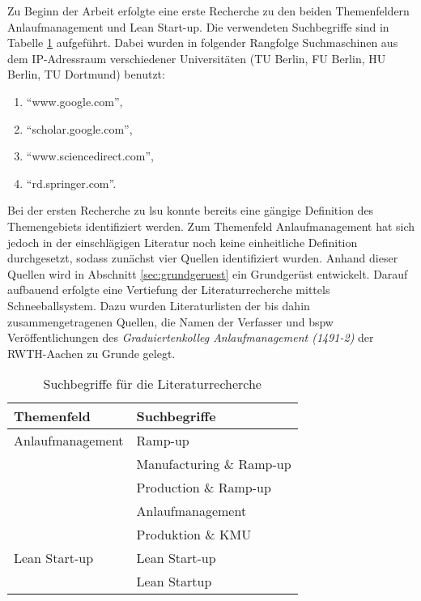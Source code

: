 Zu Beginn der Arbeit erfolgte eine erste Recherche zu den beiden Themenfeldern Anlaufmanagement und Lean Start-up. Die verwendeten Suchbegriffe sind in Tabelle \ref{tab:algorythm} aufgeführt. Dabei wurden in folgender Rangfolge Suchmaschinen aus dem IP-Adressraum verschiedener Universitäten (TU Berlin, FU Berlin, HU Berlin, TU Dortmund) benutzt: 
\begin{enumerate}
 \item ``www.google.com'',
 \item ``scholar.google.com'',
 \item ``www.sciencedirect.com'',
 \item ``rd.springer.com''.
 \end{enumerate}
Bei der ersten Recherche zu \gls{lsu} konnte bereits eine gängige Definition des Themengebiets identifiziert werden. 
Zum Themenfeld Anlaufmanagement hat sich jedoch in der einschlägigen Literatur noch keine einheitliche Definition durchgesetzt, sodass zunächst vier Quellen identifiziert wurden. Anhand dieser Quellen wird in Abschnitt \ref{sec:grundgeruest} ein Grundgerüst entwickelt. 
% 
% 
Darauf aufbauend erfolgte eine Vertiefung der Literaturrecherche mittels Schneeballsystem. Dazu wurden Literaturlisten der bis dahin zusammengetragenen Quellen, die Namen der Verfasser und \gls{bspw} Veröffentlichungen des \textit{Graduiertenkolleg Anlaufmanagement (1491-2)} der RWTH-Aachen zu Grunde gelegt. 
 \begin{table}[h]
\caption{Suchbegriffe für die Literaturrecherche} \label{tab:algorythm} 
\begin{center}
\begin{tabular}{l l}
\textbf{Themenfeld} & \textbf{Suchbegriffe}\\ \hline
Anlaufmanagement & Ramp-up \\
& Manufacturing \& Ramp-up \\ 
& Production \& Ramp-up \\ 
& Anlaufmanagement  \\
& Produktion \& KMU  \\ \hline
Lean Start-up & Lean Start-up \\
& Lean Startup
 \end{tabular} 
 \end{center}
\end{table}

